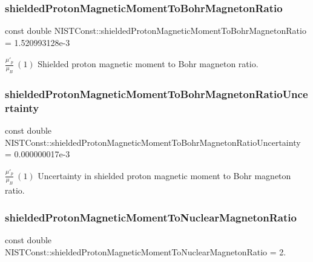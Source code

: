\subsubsection{\texorpdfstring{shielded\+Proton\+Magnetic\+Moment\+To\+Bohr\+Magneton\+Ratio}{shieldedProtonMagneticMomentToBohrMagnetonRatio}}
{\footnotesize\ttfamily const double N\+I\+S\+T\+Const\+::shielded\+Proton\+Magnetic\+Moment\+To\+Bohr\+Magneton\+Ratio = 1.\+520993128e-\/3}

$\frac{\mu'_p}{\mu_B} \ (1)$ Shielded proton magnetic moment to Bohr magneton ratio. \mbox{\label{group___n_i_s_t_const-_proton_ga4dc5506090e7cff7b2507713994e986d}} 
\subsubsection{\texorpdfstring{shielded\+Proton\+Magnetic\+Moment\+To\+Bohr\+Magneton\+Ratio\+Uncertainty}{shieldedProtonMagneticMomentToBohrMagnetonRatioUncertainty}}
{\footnotesize\ttfamily const double N\+I\+S\+T\+Const\+::shielded\+Proton\+Magnetic\+Moment\+To\+Bohr\+Magneton\+Ratio\+Uncertainty = 0.\+000000017e-\/3}

$\frac{\mu'_p}{\mu_B} \ (1)$ Uncertainty in shielded proton magnetic moment to Bohr magneton ratio. \mbox{\label{group___n_i_s_t_const-_proton_ga03e84ef0d1452fa7c647f8866913fbc3}} 
\subsubsection{\texorpdfstring{shielded\+Proton\+Magnetic\+Moment\+To\+Nuclear\+Magneton\+Ratio}{shieldedProtonMagneticMomentToNuclearMagnetonRatio}}
{\footnotesize\ttfamily const double N\+I\+S\+T\+Const\+::shielded\+Proton\+Magnetic\+Moment\+To\+Nuclear\+Magneton\+Ratio = 2.}

